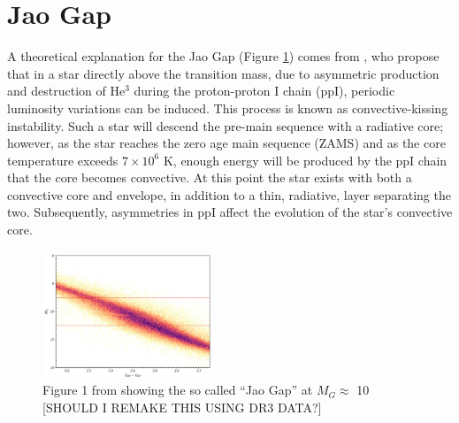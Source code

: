 \section{Jao Gap}\label{sec:JaoGap}
A theoretical explanation for the Jao Gap (Figure \ref{fig:JaoGap}) comes from
\citet{van2012}, who propose that in a star directly above the transition mass,
due to asymmetric production and destruction of He$^{3}$ during the
proton-proton I chain (ppI), periodic luminosity variations can be induced.
This process is known as convective-kissing instability. Such a star will
descend the pre-main sequence with a radiative core; however, as the star
reaches the zero age main sequence (ZAMS) and as the core temperature exceeds
$7\times 10^{6}$ K, enough energy will be produced by the ppI chain that the
core becomes convective. At this point the star exists with both a convective
core and envelope, in addition to a thin, radiative, layer separating the two.
Subsequently, asymmetries in ppI affect the evolution of the star's convective
core.

\begin{figure}
	\centering
	\includegraphics[width=0.45\textwidth]{src/figures/JaoGap.png}
	\caption{Figure 1 from \citet{Jao2018} showing the so called ``Jao Gap'' at
	$M_{G}\approx$ 10 {\color{red} [SHOULD I REMAKE THIS USING DR3 DATA?]}}
	\label{fig:JaoGap}
\end{figure}

